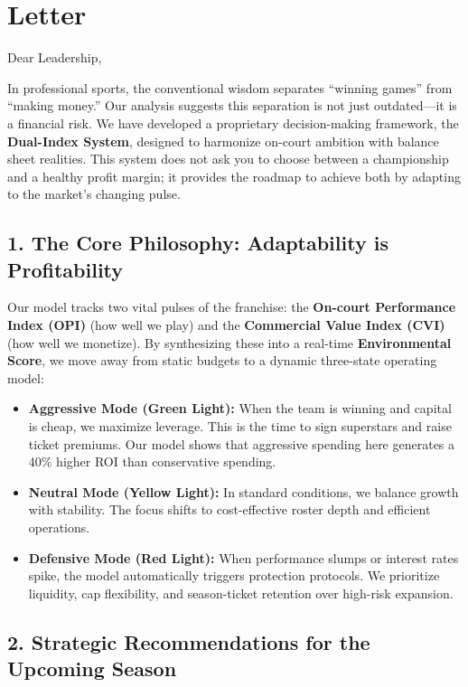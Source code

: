 \documentclass{mcmthesis}
\begin{document}
\section{Letter}
\vspace{0.5cm}


\vspace{0.5cm}

Dear Leadership,

In professional sports, the conventional wisdom separates ``winning games'' from ``making money.'' Our analysis suggests this separation is not just outdated—it is a financial risk. We have developed a proprietary decision-making framework, the \textbf{Dual-Index System}, designed to harmonize on-court ambition with balance sheet realities. This system does not ask you to choose between a championship and a healthy profit margin; it provides the roadmap to achieve both by adapting to the market's changing pulse.

\subsection*{1. The Core Philosophy: Adaptability is Profitability}
Our model tracks two vital pulses of the franchise: the \textbf{On-court Performance Index (OPI)} (how well we play) and the \textbf{Commercial Value Index (CVI)} (how well we monetize). By synthesizing these into a real-time \textbf{Environmental Score}, we move away from static budgets to a dynamic three-state operating model:

\begin{itemize}
    \item \textbf{Aggressive Mode (Green Light):} When the team is winning and capital is cheap, we maximize leverage. This is the time to sign superstars and raise ticket premiums. Our model shows that aggressive spending here generates a 40\% higher ROI than conservative spending.
    \item \textbf{Neutral Mode (Yellow Light):} In standard conditions, we balance growth with stability. The focus shifts to cost-effective roster depth and efficient operations.
    \item \textbf{Defensive Mode (Red Light):} When performance slumps or interest rates spike, the model automatically triggers protection protocols. We prioritize liquidity, cap flexibility, and season-ticket retention over high-risk expansion.
\end{itemize}

\subsection*{2. Strategic Recommendations for the Upcoming Season}
\end{document}
